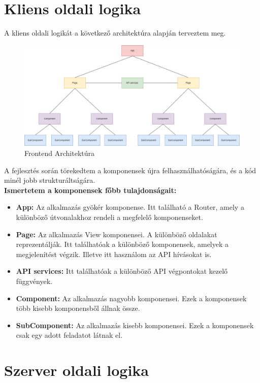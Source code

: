 \section*{Kliens oldali logika}
A kliens oldali logikát a következő architektúra alapján terveztem meg.
\begin{figure}[H]
    \centering
    \includegraphics[width=14.0truecm]{images/Frontend_architecture.png}
    \caption{Frontend Architektúra}
    \label{fig:frontend_architecture}
\end{figure}
A fejlesztés során törekedtem a komponensek újra felhasználhatóságára, és a kód minél jobb strukturáltságára.
\\
\textbf{Ismertetem a komponensek főbb tulajdonságait:}
\begin{itemize}
    \item \textbf{App:} Az alkalmazás gyökér komponense. Itt található a Router, amely a különböző útvonalakhoz rendeli a megfelelő komponenseket.
    \item \textbf{Page:} Az alkalmazás View komponensei. A különböző oldalakat reprezentálják. Itt találhatóak a különböző komponensek, amelyek a megjelenítést végzik. Illetve itt használom az API hívásokat is.
    \item \textbf{API services:} Itt találhatóak a különböző API végpontokat kezelő függvények.
    \item \textbf{Component:} Az alkalmazás nagyobb komponensei. Ezek a komponensek több kisebb komponensből állnak össze.
    \item \textbf{SubComponent:} Az alkalmazás kisebb komponensei. Ezek a komponensek csak egy adott feladatot látnak el.
\end{itemize}


\section*{Szerver oldali logika}
